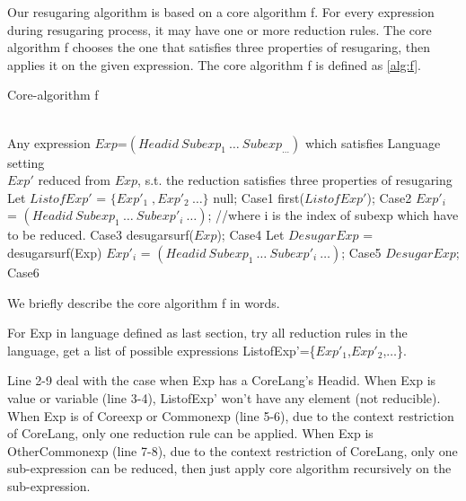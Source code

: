 Our resugaring algorithm is based on a core algorithm f. For every expression during resugaring process, it may have one or more reduction rules. The core algorithm f chooses the one that satisfies three properties of resugaring, then applies it on the given expression. The core algorithm f is defined as \ref{alg:f}.
\begin{algorithm}
	\caption{Core-algorithm f}
	\label{alg:f}     %
	\begin{algorithmic}[1]       %
		\REQUIRE ~~\\      %
		Any expression $Exp$=$(Headid~Subexp_{1}~\ldots~Subexp_{\ldots})$ which satisfies Language setting
		\ENSURE ~~\\     %
		$Exp'$ reduced from $Exp$, s.t. the reduction satisfies three properties of resugaring
		\STATE     Let $ListofExp'$ = $\{Exp'_{1}\;,Exp'_{2}~\ldots\}$
		\RETURN null; \hfill Case1
		\RETURN first($ListofExp'$); \hfill Case2
		\ELSE
		\RETURN $Exp'_{i}$ = $(Headid~Subexp_{1}~\ldots~Subexp'_{i}~\ldots)$; //where i is the index of subexp which have to be reduced. \hfill Case3
		\ENDIF
		\ELSE
		\RETURN desugarsurf($Exp$); \hfill Case4
		\ELSE
		\STATE Let $DesugarExp$ = desugarsurf(Exp)
		\RETURN $Exp'_{i}$ = $(Headid~Subexp_{1}~\ldots~Subexp'_{i}~\ldots)$; \hfill Case5
		\ELSE
		\RETURN $DesugarExp$; \hfill Case6
		\ENDIF
		\ENDIF
		\ENDIF

	\end{algorithmic}
\end{algorithm}

We briefly describe the core algorithm f in words.

For Exp in language defined as last section, try all reduction rules in the language, get a list of possible expressions ListofExp'=\{$Exp'_{1}$,$Exp'_{2}$,$\ldots$\}.

Line 2-9 deal with the case when Exp has a CoreLang's Headid. When Exp is value or variable (line 3-4), ListofExp' won't have any element (not reducible). When Exp is of Coreexp or Commonexp (line 5-6), due to the context restriction of CoreLang, only one reduction rule can be applied. When Exp is OtherCommonexp (line 7-8), due to the context restriction of CoreLang, only one sub-expression can be reduced, then just apply core algorithm recursively on the sub-expression.

